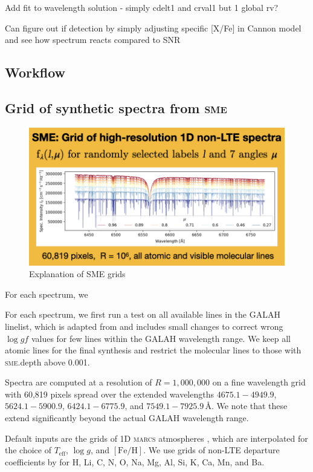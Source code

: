 \documentclass[
  journal=pasa,
  manuscript=research-paper, %
  year=2021,
  volume=37,
]{cup-journal}
\newcommand{\Teff}{$T_\mathrm{eff}$\xspace}
\newcommand{\logg}{$\log g$\xspace}
\newcommand{\feh}{$\mathrm{[Fe/H]}$\xspace}
\newcommand{\sme}{\textsc{sme}\xspace}
\newcommand{\marcs}{\textsc{marcs}\xspace}
\newcommand{\Angstroem}{\,\text{\AA}}	%
\begin{document}
Add fit to wavelength solution - simply cdelt1 and crval1 but 1 global rv?

Can figure out if detection by simply adjusting specific [X/Fe] in Cannon model and see how spectrum reacts compared to SNR

\subsection{Workflow}

\subsection{Grid of synthetic spectra from \sme}

\begin{figure}[hbt!]
 \centering
 \includegraphics[width=\columnwidth]{figures/sme_grid.png}
 \caption{Explanation of SME grids}
 \label{fig:sme_grid}
\end{figure}

For each spectrum, we 

For each spectrum, we first run a test on all available lines in the GALAH linelist, which is adapted from \citet{Heiter2021} and includes small changes to correct wrong $\log gf$ values for few lines within the GALAH wavelength range. We keep all atomic lines for the final synthesis and restrict the molecular lines to those with \textsc{sme}.depth above 0.001.

Spectra are computed at a resolution of $R = 1,000,000$ on a fine wavelength grid with 60,819 pixels spread over the extended wavelengths $4675.1- 4949.9$, $5624.1-5900.9$, $6424.1-6775.9$, and $7549.1-7925.9 \Angstroem$. We note that these extend significantly beyond the actual GALAH wavelength range.

Default inputs are the grids of 1D \marcs atmospheres \citep[][version 2014]{Gustafsson2008}, which are interpolated for the choice of \Teff, \logg, and \feh. We use grids of non-LTE departure coefficients by \citet{Amarsi2020} for H, Li, C, N, O, Na, Mg, Al, Si, K, Ca, Mn, and Ba.
\end{document}
